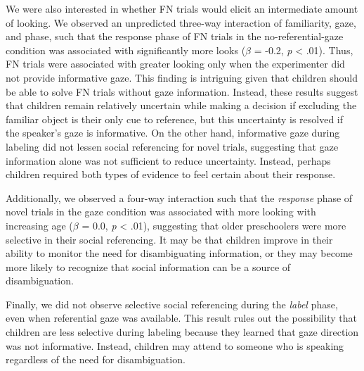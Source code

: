 \documentclass[a4paper,man,apacite,floatsintext]{apa6}
\begin{document}
We were also interested in whether FN trials would elicit an
intermediate amount of looking. We observed an unpredicted three-way
interaction of familiarity, gaze, and phase, such that the response
phase of FN trials in the no-referential-gaze condition was associated
with significantly more looks (\(\beta\) = -0.2, \emph{p} \textless{}
.01). Thus, FN trials were associated with greater looking only when the
experimenter did not provide informative gaze. This finding is
intriguing given that children should be able to solve FN trials without
gaze information. Instead, these results suggest that children remain
relatively uncertain while making a decision if excluding the familiar
object is their only cue to reference, but this uncertainty is resolved
if the speaker's gaze is informative. On the other hand, informative
gaze during labeling did not lessen social referencing for novel trials,
suggesting that gaze information alone was not sufficient to reduce
uncertainty. Instead, perhaps children required both types of evidence
to feel certain about their response.

Additionally, we observed a four-way interaction such that the
\emph{response} phase of novel trials in the gaze condition was
associated with more looking with increasing age (\(\beta\) = 0.0,
\emph{p} \textless{} .01), suggesting that older preschoolers were more
selective in their social referencing. It may be that children improve
in their ability to monitor the need for disambiguating information, or
they may become more likely to recognize that social information can be
a source of disambiguation.

Finally, we did not observe selective social referencing during the
\emph{label} phase, even when referential gaze was available. This
result rules out the possibility that children are less selective during
labeling because they learned that gaze direction was not informative.
Instead, children may attend to someone who is speaking regardless of
the need for disambiguation.
\end{document}
